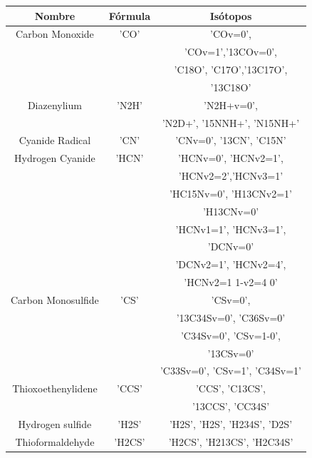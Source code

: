 \documentclass[twocolumn, draft]{emulateapj}
\begin{document}
\begin {table}[H]
\begin{center}
	\begin{tabular}{|c|c|c|}
		\hline Nombre & Fórmula &  Isótopos \\ 
		
		\hline 	Carbon Monoxide & 'CO' & 'COv=0',\\
		&        &  'COv=1','13COv=0',\\
		&	   & 'C18O', 'C17O','13C17O', \\
		&	   & '13C18O'\\
		
		\hline	Diazenylium & 'N2H' & 'N2H+v=0',\\
		&        &   'N2D+', '15NNH+', 'N15NH+' \\
		
		\hline	Cyanide Radical & 'CN' & 'CNv=0', '13CN', 'C15N' \\
		
		\hline	Hydrogen Cyanide & 'HCN' & 'HCNv=0', 'HCNv2=1',\\
		&        &   'HCNv2=2','HCNv3=1' \\
		&       & 'HC15Nv=0', 'H13CNv2=1'\\
		&        &   'H13CNv=0'\\
		&       & 'HCNv1=1', 'HCNv3=1',\\
		&        &   'DCNv=0'\\
		&       & 'DCNv2=1', 'HCNv2=4',\\
		&        &    'HCNv2=1 1-v2=4 0' \\
		
		\hline  Carbon Monosulfide & 'CS' & 'CSv=0',\\
		&        &   '13C34Sv=0', 'C36Sv=0'\\
		&      & 'C34Sv=0', 'CSv=1-0',\\
		&        &   '13CSv=0'\\
		&      & 'C33Sv=0', 'CSv=1', 'C34Sv=1' \\
		
		\hline	Thioxoethenylidene & 'CCS' & 'CCS', 'C13CS',\\
		&        &   '13CCS', 'CC34S' \\
		
		\hline	Hydrogen sulfide & 'H2S' & 'H2S', 'H2S', 'H234S', 'D2S' \\
		
		\hline	Thioformaldehyde & 'H2CS' & 'H2CS', 'H213CS', 'H2C34S' \\
		

\end{tabular}
\end{center}
\end{table}
\end{document}
